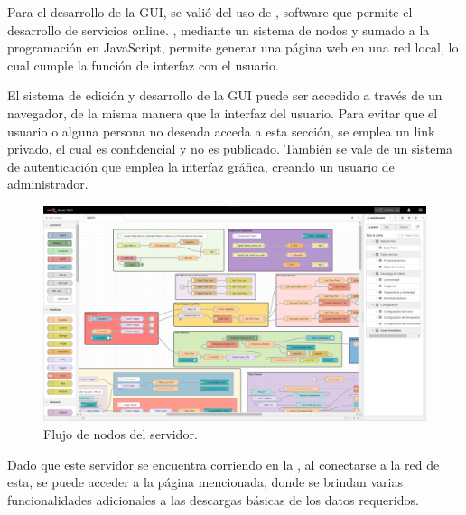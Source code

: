 Para el desarrollo de la GUI, se valió del uso de \nodered, software que permite el desarrollo de servicios online. \nodered, mediante un sistema de nodos y sumado a la programación en JavaScript, permite generar una página web en una red local, lo cual cumple la función de interfaz con el usuario.

El sistema de edición y desarrollo de la GUI puede ser accedido a través de un navegador, de la misma manera que la interfaz del usuario. Para evitar que el usuario o alguna persona no deseada acceda a esta sección, se emplea un link privado, el cual es confidencial y no es publicado. También se vale de un sistema de autenticación que emplea la interfaz gráfica, creando un usuario de administrador.
\begin{figure}[H]
	\centering
	\includegraphics[width=0.9\linewidth]{ImagenesIngenieria de Detalle/Node-Red-Flow}
	\caption{Flujo de nodos del servidor.}
	\label{fig:node_red_flow}
\end{figure}

Dado que este servidor se encuentra corriendo en la \rpi, al conectarse a la red de esta, se puede acceder a la página mencionada, donde se brindan varias funcionalidades adicionales a las descargas básicas de los datos requeridos.


